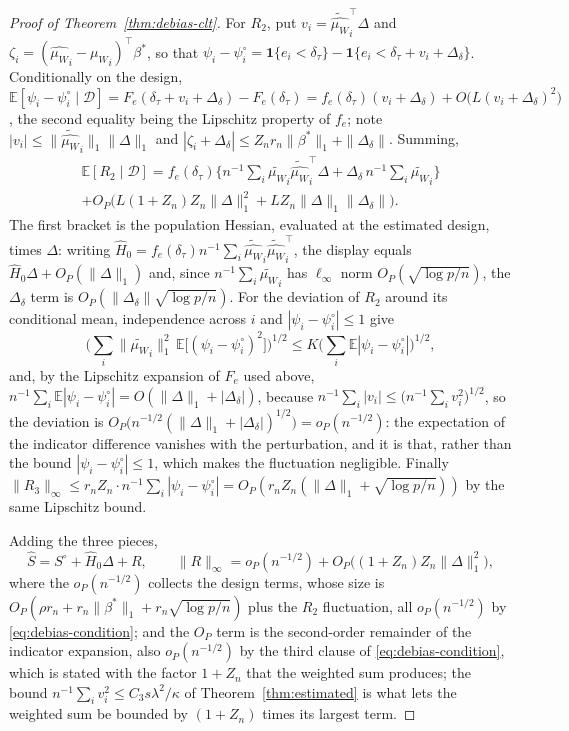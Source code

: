 \documentclass[12pt,a4paper]{article}
\theoremstyle{definition}
\theoremstyle{remark}
\newcommand{\E}{\mathbb{E}}
\newcommand{\ind}[1]{\mathbf{1}\{#1\}}
\newcommand{\betas}{\beta^*}
\newcommand{\muv}{\mu_W}
\begin{document}
\begin{proof}[Proof of Theorem~\ref{thm:debias-clt}]
For $R_2$, put $v_i={\tilde{\hat{\muv}}}_i^\top\Delta$ and
$\zeta_i=({\hat{\muv}}_i-{\muv}_i)^\top\betas$, so that
$\psi_i-\psi_i^\circ=\ind{e_i<\delta_\tau}-\ind{e_i<\delta_\tau+v_i+\Delta_\delta}$.
Conditionally on the design,
$\E[\psi_i-\psi_i^\circ\mid\mathcal{D}]
= F_e(\delta_\tau+v_i+\Delta_\delta)-F_e(\delta_\tau)
= f_e(\delta_\tau)(v_i+\Delta_\delta)+O\big(L(v_i+\Delta_\delta)^2\big)$,
the second equality being the Lipschitz property of $f_e$; note
$|v_i|\le\|{\tilde{\hat{\muv}}}_i\|_1\|\Delta\|_1$ and
$|\zeta_i+\Delta_\delta|\le Z_nr_n\|\betas\|_1+\|\Delta_\delta\|$. Summing,
\[
\begin{split}
\E[R_2\mid\mathcal{D}]
=f_e(\delta_\tau)\Big\{n^{-1}\sum_i{\tilde{\muv}}_i{\tilde{\hat{\muv}}}_i^\top\Delta
+\Delta_\delta\,n^{-1}\sum_i{\tilde{\muv}}_i\Big\}\\
+O_P\big(L(1+Z_n)Z_n\|\Delta\|_1^2+LZ_n\|\Delta\|_1\|\Delta_\delta\|\big).
\end{split}
\]
The first bracket is the population Hessian, evaluated at the estimated design, times
$\Delta$: writing $\hat H_0=f_e(\delta_\tau)n^{-1}\sum_i{\tilde{\hat{\muv}}}_i{\tilde{\hat{\muv}}}_i^\top$,
the display equals $\hat H_0\Delta+O_P(\|\Delta\|_1)$ and, since
$n^{-1}\sum_i{\tilde{\muv}}_i$ has $\ell_\infty$ norm $O_P(\sqrt{\log p/n})$, the
$\Delta_\delta$ term is $O_P(\|\Delta_\delta\|\sqrt{\log p/n})$. For the deviation of $R_2$
around its conditional mean, independence across $i$ and $|\psi_i-\psi_i^\circ|\le1$ give
\[
\Big(\sum_i\|{\tilde{\muv}}_i\|_1^2\,\E\big[(\psi_i-\psi_i^\circ)^2\big]\Big)^{1/2}
\le K\Big(\sum_i\E|\psi_i-\psi_i^\circ|\Big)^{1/2},
\]
and, by the Lipschitz expansion of $F_e$ used above,
$n^{-1}\sum_i\E|\psi_i-\psi_i^\circ|=O(\|\Delta\|_1+|\Delta_\delta|)$, because
$n^{-1}\sum_i|v_i|\le\big(n^{-1}\sum_iv_i^2\big)^{1/2}$, so the deviation is
$O_P\big(n^{-1/2}(\|\Delta\|_1+|\Delta_\delta|)^{1/2}\big)=o_P(n^{-1/2})$: the expectation of
the indicator difference vanishes with the perturbation, and it is that, rather than the bound
$|\psi_i-\psi_i^\circ|\le1$, which makes the fluctuation negligible.
Finally $\|R_3\|_\infty\le r_nZ_n\cdot n^{-1}\sum_i|\psi_i-\psi_i^\circ|
=O_P(r_nZ_n(\|\Delta\|_1+\sqrt{\log p/n}))$ by the same Lipschitz bound.

Adding the three pieces,
\begin{equation}
\hat S=S^\circ+\hat H_0\Delta+R,
\qquad
\|R\|_\infty=o_P(n^{-1/2})+O_P\big((1+Z_n)Z_n\|\Delta\|_1^2\big),
\label{eq:debias-expansion}
\end{equation}
where the $o_P(n^{-1/2})$ collects the design terms, whose size is
$O_P(\rho r_n+r_n\|\betas\|_1+r_n\sqrt{\log p/n})$ plus the $R_2$ fluctuation, all
$o_P(n^{-1/2})$ by \eqref{eq:debias-condition}; and the $O_P$ term is the second-order
remainder of the indicator expansion, also $o_P(n^{-1/2})$ by the third clause of
\eqref{eq:debias-condition}, which is stated with the factor $1+Z_n$ that the weighted sum
produces; the bound $n^{-1}\sum_i v_i^2\le C_3s\lambda^2/\kappa$ of
Theorem~\ref{thm:estimated} is what lets the weighted sum be bounded by $(1+Z_n)$ times its
largest term.


\end{proof}
\end{document}
